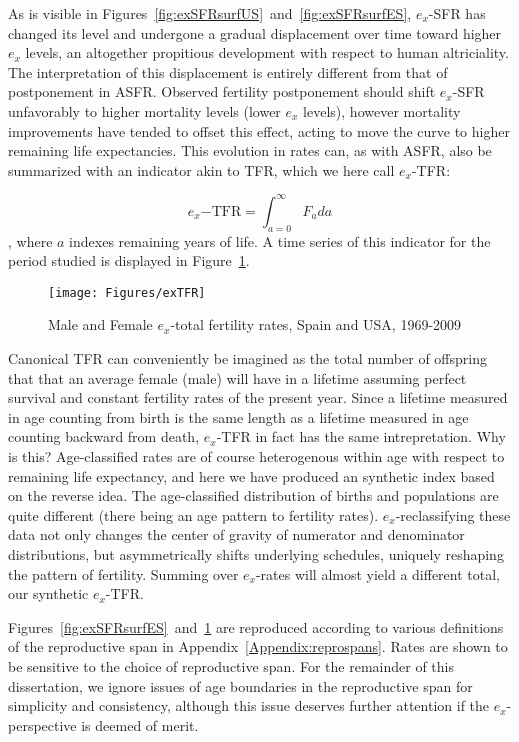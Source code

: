 As is visible in Figures~\ref{fig:exSFRsurfUS}~and~\ref{fig:exSFRsurfES}, 
$e_x$-SFR has changed its level and undergone a gradual displacement over 
time toward higher $e_x$ levels, an altogether propitious development
with respect to human altriciality. The interpretation of this displacement is
entirely different from that of postponement in ASFR. Observed fertility 
postponement should shift $e_x$-SFR unfavorably to higher mortality 
levels (lower $e_x$ levels), however mortality improvements have tended to 
offset this effect, acting to move the curve to higher
remaining life expectancies. This evolution in rates can, as with ASFR, also be
summarized with an indicator akin to TFR, which we here call $e_x$-TFR:

\begin{equation}
\label{eq:exTFR}
e_x\mathrm{-TFR} = \int _{a=0}^\infty F_a da
\end{equation}
, where $a$ indexes remaining years of life. A time series of this indicator
for the period studied is displayed in Figure~\ref{fig:exTFR}.

\begin{figure}[ht!]
        \centering  
          \caption{Male and Female $e_x$-total fertility rates, Spain
          and USA, 1969-2009}
           \texttt{[image: Figures/exTFR]}
          \label{fig:exTFR}
\end{figure}

Canonical TFR can conveniently be imagined as the total number of
offspring that that an average female (male) will have in a lifetime assuming
perfect survival and constant fertility rates of the present year.
Since a lifetime measured in age counting from birth is the same length as a
lifetime measured in age counting backward from death, $e_x$-TFR in fact has the
same intrepretation. Why is this? Age-classified rates are of course
heterogenous within age with respect to remaining life expectancy, and here we have produced
an synthetic index based on the reverse idea. The age-classified
distribution of births and populations are quite different (there being an age
pattern to fertility rates). $e_x$-reclassifying these data not only changes the
center of gravity of numerator and denominator distributions, but asymmetrically
shifts underlying schedules, uniquely reshaping the pattern of
fertility. Summing over $e_x$-rates will almost yield a different total, our
synthetic $e_x$-TFR. 

Figures~\ref{fig:exSFRsurfES}~and~\ref{fig:exTFR} are reproduced according to
various definitions of the reproductive span in
Appendix~\ref{Appendix:reprospans}. Rates are shown to be sensitive to the
choice of reproductive span. For the remainder of this dissertation, we ignore
issues of age boundaries in the reproductive span for simplicity and
consistency, although this issue deserves further attention if the
$e_x$-perspective is deemed of merit.

